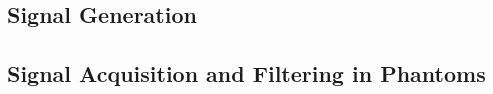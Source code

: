 \documentclass[../../00_Main/Main.tex]{subfiles}
\begin{document}


\subsection{Signal Generation}


\subsection{Signal Acquisition and Filtering in Phantoms}


\biblio%
\end{document}
